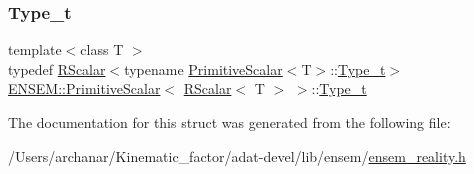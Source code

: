 \subsubsection{\texorpdfstring{Type\_t}{Type\_t}\hspace{0.1cm}{\footnotesize\ttfamily [3/3]}}
{\footnotesize\ttfamily template$<$class T $>$ \\
typedef \mbox{\hyperlink{classENSEM_1_1RScalar}{R\+Scalar}}$<$typename \mbox{\hyperlink{structENSEM_1_1PrimitiveScalar}{Primitive\+Scalar}}$<$T$>$\+::\mbox{\hyperlink{structENSEM_1_1PrimitiveScalar_3_01RScalar_3_01T_01_4_01_4_af25173576e04e62938a35f7747631b4f}{Type\+\_\+t}}$>$ \mbox{\hyperlink{structENSEM_1_1PrimitiveScalar}{E\+N\+S\+E\+M\+::\+Primitive\+Scalar}}$<$ \mbox{\hyperlink{classENSEM_1_1RScalar}{R\+Scalar}}$<$ T $>$ $>$\+::\mbox{\hyperlink{structENSEM_1_1PrimitiveScalar_3_01RScalar_3_01T_01_4_01_4_af25173576e04e62938a35f7747631b4f}{Type\+\_\+t}}}



The documentation for this struct was generated from the following file\+:\begin{DoxyCompactItemize}
\item 
/\+Users/archanar/\+Kinematic\+\_\+factor/adat-\/devel/lib/ensem/\mbox{\hyperlink{adat-devel_2lib_2ensem_2ensem__reality_8h}{ensem\+\_\+reality.\+h}}\end{DoxyCompactItemize}
